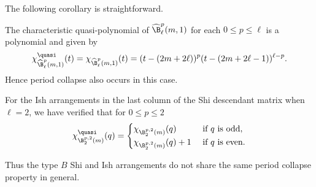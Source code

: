 The following corollary is straightforward. 
\begin{corollary} 
\label{cor:CQP-BSI-hat}
The characteristic quasi-polynomial of $ \widehat\B^{p}_\ell(m,1)$ for each $0 \le p \le \ell$ is a polynomial and given by 
$$\chi^{\quasi}_{\widehat\B^{p}_\ell(m,1)}(t)= \chi_{\widehat\B^{p}_\ell(m,1)}(t) =  (t-(2m+2\ell))^{p}(t-(2m+2\ell-1))^{\ell-p}.$$
Hence period collapse also occurs in this case.
\end{corollary}


For the Ish arrangements in the last column of the Shi descendant matrix when $\ell=2$, we have verified that for $0\le p \le 2$
$$\chi^{\quasi}_{\B^{p,2}_2(m)}(q) = \begin{cases}
\chi_{\B^{p,2}_2(m)}(q)  & \mbox{ if $q$ is odd}, \\
\chi_{\B^{p,2}_2(m)}(q) +1 &  \mbox{ if $q$ is even}. 
\end{cases}$$

Thus the type $B$ Shi and Ish arrangements do not share the same period collapse property in general.
 


